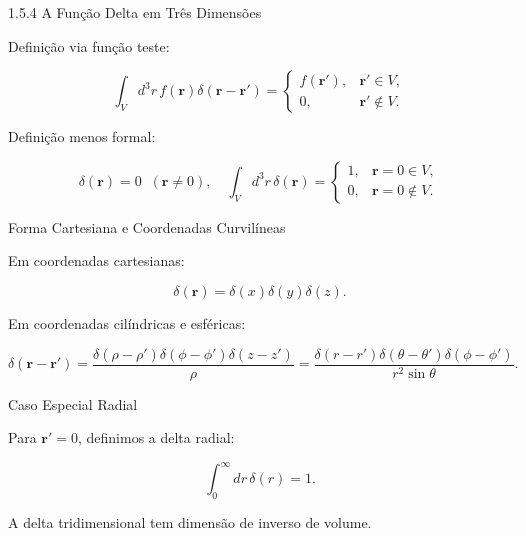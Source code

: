 \documentclass[aspectratio=169]{beamer}
\begin{document}
\begin{frame}{1.5.4 A Função Delta em Três Dimensões}

Definição via função teste:

\begin{equation}
\int_V d^3r\, f(\mathbf r)\delta(\mathbf r-\mathbf r')
=
\begin{cases}
f(\mathbf r'), & \mathbf r' \in V, \\
0, & \mathbf r' \notin V.
\end{cases}
\tag{1.112}
\end{equation}

Definição menos formal:

\begin{equation}
\delta(\mathbf r)=0 \;\; (\mathbf r\neq 0),
\quad
\int_V d^3r\,\delta(\mathbf r)
=
\begin{cases}
1, & \mathbf r=0\in V,\\
0, & \mathbf r=0\notin V.
\end{cases}
\tag{1.113}
\end{equation}

\end{frame}

\begin{frame}{Forma Cartesiana e Coordenadas Curvilíneas}

Em coordenadas cartesianas:

\begin{equation}
\delta(\mathbf r)=\delta(x)\delta(y)\delta(z).
\tag{1.114}
\end{equation}

Em coordenadas cilíndricas e esféricas:

\begin{equation}
\delta(\mathbf r-\mathbf r')
=
\frac{\delta(\rho-\rho')\delta(\phi-\phi')\delta(z-z')}{\rho}
=
\frac{\delta(r-r')\delta(\theta-\theta')\delta(\phi-\phi')}{r^2\sin\theta}.
\tag{1.115}
\end{equation}

\end{frame}

\begin{frame}{Caso Especial Radial}

Para $\mathbf r'=0$, definimos a delta radial:

\begin{equation}
\int_0^\infty dr\, \delta(r)=1.
\tag{1.116}
\end{equation}

\begin{tcolorbox}[colback=blue!5,colframe=blue]
A delta tridimensional tem dimensão de inverso de volume.
\end{tcolorbox}

\end{frame}
\end{document}
